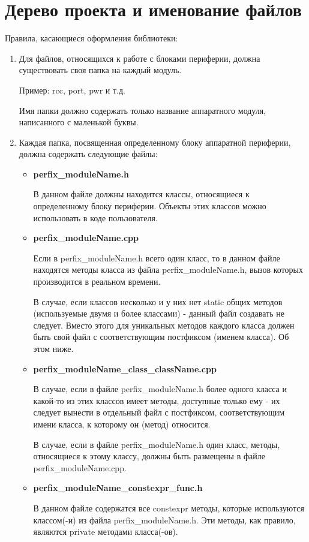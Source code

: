 \section{Дерево проекта и именование файлов}
\label{dn:0}
Правила, касающиеся оформления библиотеки:
\begin{enumerate}
	\item Для файлов, относящихся к работе с блоками периферии, должна существовать своя папка на каждый модуль.
	
	Пример: rcc, port, pwr и т.д.
	
	Имя папки должно содержать только название аппаратного модуля, написанного с маленькой буквы.
	\item Каждая папка, посвященная определенному блоку аппаратной периферии, должна содержать следующие файлы:
	\begin{itemize}
		\item \textbf{perfix\_moduleName.h}
		
		В данном файле должны находится классы, относящиеся к определенному блоку периферии. Объекты этих классов можно использовать в коде пользователя.
		\item \textbf{perfix\_moduleName.cpp}
		
		Если в perfix\_moduleName.h всего один класс, то в данном файле находятся методы класса из файла perfix\_moduleName.h, вызов которых производится в реальном времени. 
		
		В случае, если классов несколько и у них нет static общих методов (используемые двумя и более классами) - данный файл создавать не следует. Вместо этого для уникальных методов каждого класса должен быть свой файл с соответствующим постфиксом (именем класса). Об этом ниже.
		\item \textbf{perfix\_moduleName\_class\_className.cpp}
		
		В случае, если в файле perfix\_moduleName.h более одного класса и какой-то из этих классов имеет методы, доступные только ему - их следует вынести в отдельный файл с постфиксом, соответствующим имени класса, к которому он (метод) относится. 
		
		В случае, если в файле perfix\_moduleName.h один класс, методы, относящиеся к этому классу, должны быть размещены в файле perfix\_\-moduleName.cpp.
		
		\item \textbf{perfix\_moduleName\_constexpr\_func.h}
		
		В данном файле содержатся все constexpr методы, которые используются классом(-и) из файла perfix\_moduleName.h. Эти методы, как правило, являются private методами класса(-ов). 
		

\end{itemize}
\end{enumerate}
